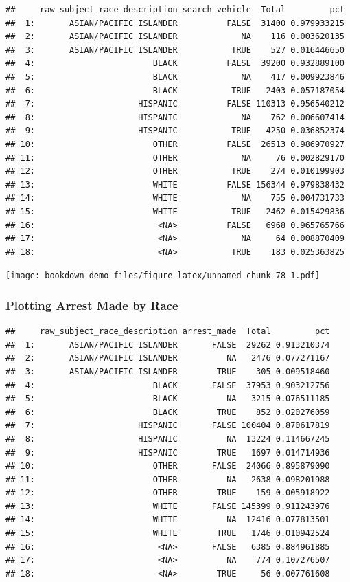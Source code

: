\documentclass[
]{book}
\begin{document}
\begin{verbatim}
##     raw_subject_race_description search_vehicle  Total         pct
##  1:       ASIAN/PACIFIC ISLANDER          FALSE  31400 0.979933215
##  2:       ASIAN/PACIFIC ISLANDER             NA    116 0.003620135
##  3:       ASIAN/PACIFIC ISLANDER           TRUE    527 0.016446650
##  4:                        BLACK          FALSE  39200 0.932889100
##  5:                        BLACK             NA    417 0.009923846
##  6:                        BLACK           TRUE   2403 0.057187054
##  7:                     HISPANIC          FALSE 110313 0.956540212
##  8:                     HISPANIC             NA    762 0.006607414
##  9:                     HISPANIC           TRUE   4250 0.036852374
## 10:                        OTHER          FALSE  26513 0.986970927
## 11:                        OTHER             NA     76 0.002829170
## 12:                        OTHER           TRUE    274 0.010199903
## 13:                        WHITE          FALSE 156344 0.979838432
## 14:                        WHITE             NA    755 0.004731733
## 15:                        WHITE           TRUE   2462 0.015429836
## 16:                         <NA>          FALSE   6968 0.965765766
## 17:                         <NA>             NA     64 0.008870409
## 18:                         <NA>           TRUE    183 0.025363825
\end{verbatim}

\texttt{[image: bookdown-demo\_files/figure-latex/unnamed-chunk-78-1.pdf]}

\hypertarget{plotting-arrest-made-by-race}{%
\subsubsection{Plotting Arrest Made by Race}\label{plotting-arrest-made-by-race}}

\begin{verbatim}
##     raw_subject_race_description arrest_made  Total         pct
##  1:       ASIAN/PACIFIC ISLANDER       FALSE  29262 0.913210374
##  2:       ASIAN/PACIFIC ISLANDER          NA   2476 0.077271167
##  3:       ASIAN/PACIFIC ISLANDER        TRUE    305 0.009518460
##  4:                        BLACK       FALSE  37953 0.903212756
##  5:                        BLACK          NA   3215 0.076511185
##  6:                        BLACK        TRUE    852 0.020276059
##  7:                     HISPANIC       FALSE 100404 0.870617819
##  8:                     HISPANIC          NA  13224 0.114667245
##  9:                     HISPANIC        TRUE   1697 0.014714936
## 10:                        OTHER       FALSE  24066 0.895879090
## 11:                        OTHER          NA   2638 0.098201988
## 12:                        OTHER        TRUE    159 0.005918922
## 13:                        WHITE       FALSE 145399 0.911243976
## 14:                        WHITE          NA  12416 0.077813501
## 15:                        WHITE        TRUE   1746 0.010942524
## 16:                         <NA>       FALSE   6385 0.884961885
## 17:                         <NA>          NA    774 0.107276507
## 18:                         <NA>        TRUE     56 0.007761608
\end{verbatim}
\end{document}

